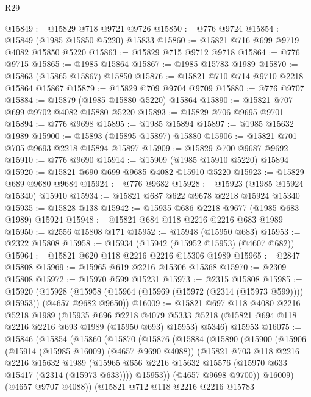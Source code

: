 \begin{lexlean}{R29}
\begin{coremodule}
@15849 := @15829 @718 @9721 @9726
@15850 := @776 @9724
@15854 := @15849 (@1985 @15850 @5220) @15833
@15860 := @15821 @716 @699 @9719 @4082 @15850 @5220
@15863 := @15829 @715 @9712 @9718
@15864 := @776 @9715
@15865 := @1985 @15864
@15867 := @1985 @15783 @1989
@15870 := @15863 (@15865 @15867) @15850
@15876 := @15821 @710 @714 @9710 @2218 @15864 @15867
@15879 := @15829 @709 @9704 @9709
@15880 := @776 @9707
@15884 := @15879 (@1985 @15880 @5220) @15864
@15890 := @15821 @707 @699 @9702 @4082 @15880 @5220
@15893 := @15829 @706 @9695 @9701
@15894 := @776 @9698
@15895 := @1985 @15894
@15897 := @1985 @15632 @1989
@15900 := @15893 (@15895 @15897) @15880
@15906 := @15821 @701 @705 @9693 @2218 @15894 @15897
@15909 := @15829 @700 @9687 @9692
@15910 := @776 @9690
@15914 := @15909 (@1985 @15910 @5220) @15894
@15920 := @15821 @690 @699 @9685 @4082 @15910 @5220
@15923 := @15829 @689 @9680 @9684
@15924 := @776 @9682
@15928 := @15923 (@1985 @15924 @15340) @15910
@15934 := @15821 @687 @622 @9678 @2218 @15924 @15340
@15935 := @15828 @138
@15942 := @15935 @686 @2218 @9677 (@1985 @683 @1989) @15924
@15948 := @15821 @684 @118 @2216 @2216 @683 @1989
@15950 := @2556 @15808 @171
@15952 := @15948 (@15950 @683)
@15953 := @2322 @15808
@15958 := @15934 (@15942 (@15952 @15953) (@4607 @682))
@15964 := @15821 @620 @118 @2216 @2216 @15306 @1989
@15965 := @2847 @15808
@15969 := @15965 @619 @2216 @15306 @15368
@15970 := @2309 @15808
@15972 := @15970 @599 @15231
@15973 := @2315 @15808
@15985 := @15920
    (@15928 (@15958 (@15964 (@15969 (@15972 (@2314 (@15973 @599)))) @15953)) (@4657 @9682 @9650))
@16009 := @15821
    @697
    @118
    @4080
    @2216
    @5218
    @1989
    (@15935
      @696
      @2218
      @4079
      @5333
      @5218
      (@15821 @694 @118 @2216 @2216 @693 @1989 (@15950 @693) @15953)
      @5346)
    @15953
@16075 := @15846
    (@15854
      (@15860
        (@15870
          (@15876
            (@15884
              (@15890
                (@15900
                  (@15906
                    (@15914 (@15985 @16009) (@4657 @9690 @4088))
                    (@15821
                      @703
                      @118
                      @2216
                      @2216
                      @15632
                      @1989
                      (@15965 @656 @2216 @15632 @15576 (@15970 @633 @15417 (@2314 (@15973 @633))))
                      @15953))
                  (@4657 @9698 @9700))
                @16009)
              (@4657 @9707 @4088))
            (@15821
              @712
              @118
              @2216
              @2216
              @15783

\end{coremodule}
\end{lexlean}

